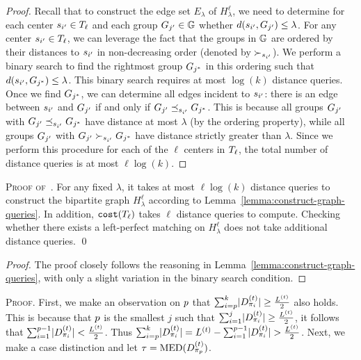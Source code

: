 \constructgraphqueries*
\begin{proof}
    Recall that to construct the edge set $E_{\lambda}$ of $H^{\ell}_{\lambda}$, we need to determine for each center $s_{i'} \in T_{\ell}$ and each group $G_{j'} \in \mathbb{G}$ whether $d(s_{i'}, G_{j'}) \leq \lambda$.
    For any center $s_{i'} \in T_{\ell}$, we can leverage the fact that the groups in $\mathbb{G}$ are ordered by their distances to $s_{i'}$ in non-decreasing order (denoted by $\succ_{s_{i'}}$). 
    We perform a binary search to find the rightmost group $G_{j^*}$ in this ordering such that $d(s_{i'}, G_{j^*}) \leq \lambda$.
    This binary search requires at most $\log(k)$ distance queries.
    Once we find $G_{j^*}$, we can determine all edges incident to $s_{i'}$: there is an edge between $s_{i'}$ and $G_{j'}$ if and only if $G_{j'} \preceq_{s_{i'}} G_{j^*}$.
    This is because all groups $G_{j'}$ with $G_{j'} \preceq_{s_{i'}} G_{j^*}$ have distance at most $\lambda$ (by the ordering property), while all groups $G_{j'}$ with $G_{j'} \succ_{s_{i'}} G_{j^*}$ have distance strictly greater than $\lambda$.
    Since we perform this procedure for each of the $\ell$ centers in $T_{\ell}$, the total number of distance queries is at most $\ell \log(k)$.
\end{proof}

\evaluatepredicatequeries*
\textsc{Proof of~.}
   For any fixed $\lambda$, it takes at most $\ell \log(k)$ distance queries to construct the bipartite graph $H^{\ell}_{\lambda}$ according to Lemma~\ref{lemma:construct-graph-queries}.
    In addition, $\texttt{cost}(T_{\ell})$ takes $\ell$ distance queries to compute.
    Checking whether there exists a left-perfect matching on $H^{\ell}_{\lambda}$ does not take additional distance queries. 
\hfill\qed


\reducesearchspace*
\begin{proof}
    The proof closely follows the reasoning in Lemma~\ref{lemma:construct-graph-queries}, with only a slight variation in the binary search condition.  
\end{proof}

\medianmedian* 
\textsc{Proof.}
First, we make an observation on $p$ that $\sum_{i=p}^{k} \lvert D_{\pi_{i}}^{(t)} \rvert  \geq \frac{L^{(t)}}{2}$ also holds. 
This is because that $p$ is the smallest $j$ such that $\sum_{i=1}^{j} \lvert D_{\pi_{i}}^{(t)} \rvert  \geq \frac{L^{(t)}}{2}$, it follows that $\sum_{i=1}^{p-1} \lvert D_{\pi_{i}}^{(t)} \rvert  < \frac{L^{(t)}}{2}$.
Thus $\sum_{i=p}^{k} \lvert D_{\pi_{i}}^{(t)} \rvert  = L^{(t)} - \sum_{i=1}^{p-1} \lvert D_{\pi_{i}}^{(t)} \rvert  > \frac{L^{(t)}}{2}$.
Next, we make a case distinction and let $\tau = \operatorname{MED}(D_{\pi_{p}}^{(t)})$. 

